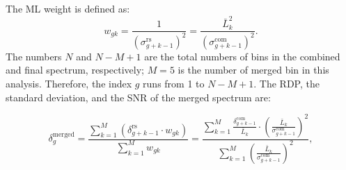 The ML weight is defined as: 
\begin{equation}
    \label{eq:merge_weight}
    w_{gk} = \frac{1}{(\sigma_{g+k-1}^\text{rs})^{2}} = \frac{\bar{L}_{k}^{2}}{(\sigma_{g+k-1}^\text{com})^{2}}.
\end{equation}
The numbers $N$ and $N-M+1$ are the total numbers of bins in 
the combined and final spectrum, respectively; $M=5$ is the number of 
merged bin in this analysis. Therefore, the index $g$ runs from 1 to $N-M+1$. 
%
%
%
%
The RDP, the standard deviation, and the SNR of the merged spectrum are:

\begin{equation}
    \delta_{g}^\text{merged} = \frac{ \sum\limits_{k = 1}^{M}\left(\delta_{g+k-1}^\text{rs} \cdot {w_{gk}}\right)}{\sum\limits_{k = 1}^{M} {w_{gk}}} = \frac{\sum\limits_{k = 1}^{M}\frac{\delta_{g+k-1}^\text{com}}{\bar{L}_{k}} \cdot \left(\frac{\bar{L}_{k}}{\sigma_{g+k-1}^\text{com}}\right)^2} {\sum\limits_{k = 1}^{M}\left(\frac{\bar{L}_{k}}{\sigma_{g+k-1}^\text{com}}\right)^2},
    \label{eq:merged_power}
\end{equation}

